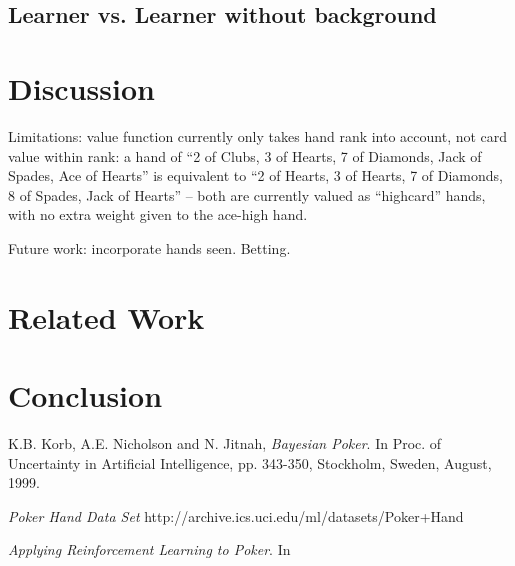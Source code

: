 \documentclass[12pt,pdftex,twocolumn]{article}
\begin{document}
\subsection{Learner vs. Learner without background}

\section{Discussion}
Limitations:   value function currently only takes hand rank into account, not card value within rank: a hand of ``2 of Clubs, 3 of Hearts, 7 of Diamonds, Jack of Spades, Ace of Hearts'' is equivalent to ``2 of Hearts, 3 of Hearts, 7 of Diamonds, 8 of Spades, Jack of Hearts'' -- both are currently valued as ``highcard'' hands, with no extra weight given to the ace-high hand. 

Future work: incorporate hands seen. Betting.

\section{Related Work}

\section{Conclusion}



%
\begin{thebibliography}{9}
K.B. Korb, A.E. Nicholson and N. Jitnah,
 \emph{Bayesian Poker}. 
In Proc. of Uncertainty in Artificial Intelligence, pp. 343-350, 
Stockholm, Sweden, August, 1999.

\emph{Poker Hand Data Set}
http://archive.ics.uci.edu/ml/datasets/Poker+Hand

	\emph{Applying Reinforcement Learning to Poker}.
In 
\end{thebibliography}
\end{document}
